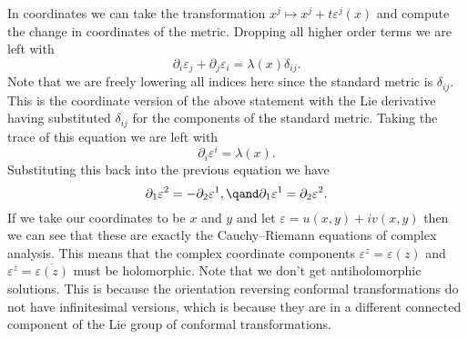 \documentclass[fleqn]{NotesClass}
\begin{document}
    In coordinates we can take the transformation \(x^j \mapsto x^j + t\varepsilon^j(x)\) and compute the change in coordinates of the metric.
    Dropping all higher order terms we are left with
    \begin{equation}
        \partial_i \varepsilon_j + \partial_j \varepsilon_i = \lambda(x) \delta_{ij}.
    \end{equation}
    Note that we are freely lowering all indices here since the standard metric is \(\delta_{ij}\).
    This is the coordinate version of the above statement with the Lie derivative having substituted \(\delta_{ij}\) for the components of the standard metric.
    Taking the trace of this equation we are left with
    \begin{equation}
        \partial_i \varepsilon^i = \lambda(x).
    \end{equation}
    Substituting this back into the previous equation we have
    \begin{equation}
        \partial_1 \varepsilon^2 = -\partial_2 \varepsilon^1, \qand \partial_1 \varepsilon^1 = \partial_2 \varepsilon^2.
    \end{equation}
    If we take our coordinates to be \(x\) and \(y\) and let \(\varepsilon = u(x, y) + iv(x, y)\) then we can see that these are exactly the Cauchy--Riemann equations of complex analysis.
    This means that the complex coordinate components \(\varepsilon^z = \varepsilon(z)\) and \(\varepsilon^{\overbar{z}} = \overline{\varepsilon(z)}\) must be holomorphic.
    Note that we don't get antiholomorphic solutions.
    This is because the orientation reversing conformal transformations do not have infinitesimal versions, which is because they are in a different connected component of the Lie group of conformal transformations.
    
\end{document}
